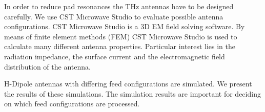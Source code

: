 In order to reduce pad resonances the THz antennas have to be designed carefully. We use CST Microwave Studio to evaluate possible antenna configurations. CST Microwave Studio is a 3D EM field solving software. By means of finite element methods (FEM) CST Microwave Studio is used to calculate many different antenna properties. Particular interest lies in the radiation impedance, the surface current and the electromagnetic field distribution of the antenna. 

H-Dipole antennas with differing feed configurations are simulated. We present the results of these simulations. The simulation results are important for deciding on which feed configurations are processed. 